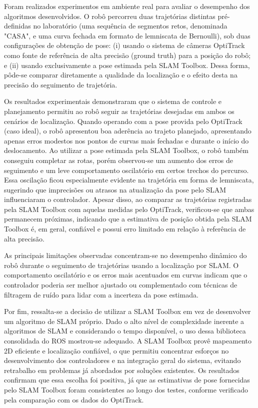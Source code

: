 Foram realizados experimentos em ambiente real para avaliar o desempenho dos algoritmos desenvolvidos. O robô percorreu duas trajetórias distintas pré-definidas no laboratório (uma sequência de segmentos retos, denominada "CASA", e uma curva fechada em formato de lemniscata de Bernoulli), sob duas configurações de obtenção de pose: (i) usando o sistema de câmeras OptiTrack como fonte de referência de alta precisão (ground truth) para a posição do robô; e (ii) usando exclusivamente a pose estimada pela SLAM Toolbox. Dessa forma, pôde-se comparar diretamente a qualidade da localização e o efeito desta na precisão do seguimento de trajetória.

Os resultados experimentais demonstraram que o sistema de controle e planejamento permitiu ao robô seguir as trajetórias desejadas em ambos os cenários de localização. Quando operando com a pose provida pelo OptiTrack (caso ideal), o robô apresentou boa aderência ao trajeto planejado, apresentando apenas erros modestos nos pontos de curvas mais fechadas e durante o início do deslocamento. Ao utilizar a pose estimada pela SLAM Toolbox, o robô também conseguiu completar as rotas, porém observou-se um aumento dos erros de seguimento e um leve comportamento oscilatório em certos trechos do percurso. Essa oscilação ficou especialmente evidente na trajetória em forma de lemniscata, sugerindo que imprecisões ou atrasos na atualização da pose pelo SLAM influenciaram o controlador. Apesar disso, ao comparar as trajetórias registradas pela SLAM Toolbox com aquelas medidas pelo OptiTrack, verificou-se que ambas permanecem próximas, indicando que a estimativa de posição obtida pela SLAM Toolbox é, em geral, confiável e possui erro limitado em relação à referência de alta precisão.

As principais limitações observadas concentram-se no desempenho dinâmico do robô durante o seguimento de trajetórias usando a localização por SLAM. O comportamento oscilatório e os erros mais acentuados em curvas indicam que o controlador poderia ser melhor ajustado ou complementado com técnicas de filtragem de ruído para lidar com a incerteza da pose estimada. 

Por fim, ressalta-se a decisão de utilizar a SLAM Toolbox em vez de desenvolver um algoritmo de SLAM próprio. Dado o alto nível de complexidade inerente a algoritmos de SLAM e considerando o tempo disponível, o uso dessa biblioteca consolidada do ROS mostrou-se adequado. A SLAM Toolbox provê mapeamento 2D eficiente e localização confiável, o que permitiu concentrar esforços no desenvolvimento dos controladores e na integração geral do sistema, evitando retrabalho em problemas já abordados por soluções existentes. Os resultados confirmam que essa escolha foi positiva, já que as estimativas de pose fornecidas pelo SLAM Toolbox foram consistentes ao longo dos testes, conforme verificado pela comparação com os dados do OptiTrack.

